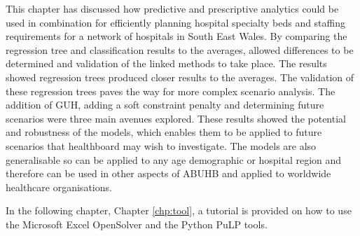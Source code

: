 \documentclass[../thesis.tex]{subfiles}
\begin{document}
This chapter has discussed how predictive and prescriptive analytics could be used in combination for efficiently planning hospital specialty beds and staffing requirements for a network of hospitals in South East Wales. By comparing the regression tree and classification results to the averages, allowed differences to be determined and validation of the linked methods to take place. The results showed regression trees produced closer results to the averages. The validation of these regression trees paves the way for more complex scenario analysis. The addition of GUH, adding a soft constraint penalty and determining future scenarios were three main avenues explored. These results showed the potential and robustness of the models, which enables them to be applied to future scenarios that healthboard may wish to investigate. The models are also generalisable so can be applied to any age demographic or hospital region and therefore can be used in other aspects of ABUHB and applied to worldwide healthcare organisations.

In the following chapter, Chapter \ref{chp:tool}, a tutorial is provided on how to use the Microsoft Excel OpenSolver and the Python PuLP tools.
\end{document}
